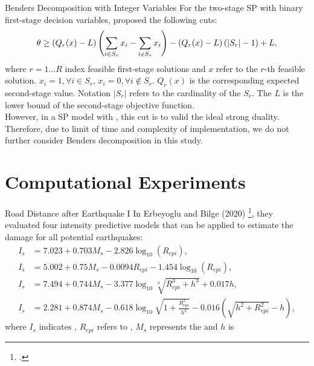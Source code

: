\documentclass[aspectratio=169]{beamer}
\begin{document}
\begin{frame}{Benders Decomposition with Integer Variables}
For the two-stage SP with binary first-stage decision variables, \cite{laporte1993integer} proposed the following cuts:
\begin{align}
\scriptsize
    \theta \geq \left( Q_{r}(x) - L \right) \left( \sum_{i \in S_r} x_i - \sum_{i \notin S_r} x_i \right) - \left( Q_{r}(x) - L \right) (|S_r| - 1) + L, \label{eq:integer_benders_cut} 
\end{align}
where $r = 1 \dots R$ index feasible first-stage solutions and $x$ refer to the $r$-th feasible solution. $x_i = 1, \forall i \in S_r$, $x_i = 0, \forall i \notin S_r$. $Q_r(x)$ is the corresponding expected second-stage value. Notation $|S_r|$ refers to the cardinality of the $S_r$. The $L$ is the lower bound of the second-stage objective function. \\
However, in a SP model with , this cut is  to valid the ideal strong duality. Therefore, due to limit of time and complexity of implementation, we do not further consider Benders decomposition in this study.
\end{frame}

\section{Computational Experiments}
\begin{frame}{Road Distance after Earthquake I}
In Erbeyoglu and Bilge (2020) \footcite{erbeyouglu2020earthquake}, they evaluated four intensity predictive models that can be applied to estimate the damage for all potential earthquakes:
\begin{subequations}
    \begin{align}
    I_s &= 7.023 + 0.703 M_s - 2.826  \log_{10}(R_{epi}), \label{eq:MSK_1} \\
    I_s &= 5.002 + 0.75 M_s - 0.0094  R_{epi} - 1.454 \log_{10}(R_{epi}) \label{eq:MSK_2}, \\
    I_s &= 7.494 + 0.744 M_s - 3.377 \log_{10} \sqrt[3]{R_{epi}^3 + h^3} + 0.017 h \label{eq:MSK_3}, \\
    I_s &= 2.281 + 0.874 M_s - 0.618 \log_{10} \sqrt{1+\frac{R_{epi}^2}{h^2}} - 0.016 \left(\sqrt{h^2 + R_{epi}^2} - h\right) \label{eq:MSK_4},
    \end{align}
\end{subequations}
where $I_s$ indicates , $R_{epi}$ refers to , $M_s$ represents the  and $h$ is  
\end{frame}
\end{document}
